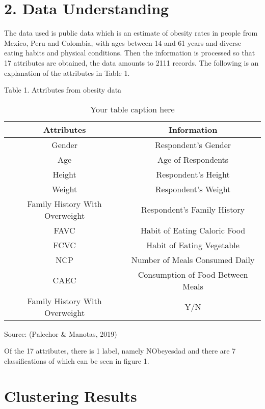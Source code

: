 \documentclass[conference]{IEEEtran}
\begin{document}
\section*{2. Data Understanding}
The data used is public data which is an estimate of obesity rates in people from Mexico, Peru and Colombia, with ages between 14 and 61 years and diverse eating habits and physical conditions. Then the information is processed so that 17 attributes are obtained, the data amounts to 2111 records. The following is an explanation of the attributes in Table 1.

Table 1. Attributes from obesity data

\begin{table}[H]
    \centering
    \caption{Your table caption here}
    \begin{tabular}{|c|c|}
    \hline
    \textbf{Attributes} & \textbf{Information} \\
    \hline
    Gender & Respondent's Gender \\
    \hline
    Age & Age of Respondents \\
    \hline
    Height & Respondent's Height \\
    \hline
    Weight & Respondent's Weight \\
    \hline
    Family History With Overweight & Respondent's Family History \\
    \hline
    FAVC & Habit of Eating Caloric Food \\
    \hline
    FCVC & Habit of Eating Vegetable \\
    \hline
    NCP & Number of Meals Consumed Daily \\
    \hline
    CAEC & Consumption of Food Between Meals \\
    \hline
    Family History With Overweight & Y/N \\
    \hline
    \end{tabular}
\end{table}

Source: (Palechor \& Manotas, 2019)

Of the 17 attributes, there is 1 label, namely NObeyesdad and there are 7 classifications of which can be seen in figure 1.

\begin{center}
\end{center}

\section{Clustering Results}
\end{document}
